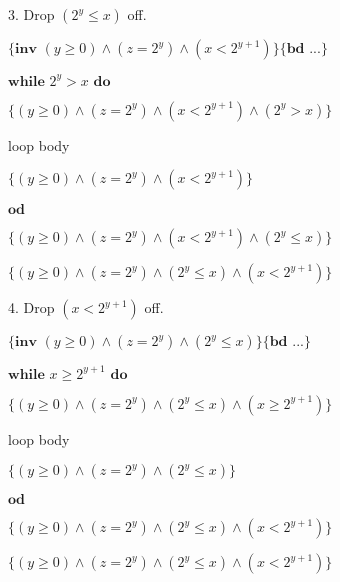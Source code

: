 \documentclass{article}
\begin{document}
\vspace{10pt}
3. Drop $(2^y \leq x)$ off.
\vspace{10pt}

$\{\textbf{inv } (y \geq 0) \wedge (z=2^y) \wedge (x<2^{y+1})\} \{\textbf{bd } ...\}$

$\textbf{while } 2^y > x \textbf{ do}$

\qquad \qquad $\{(y \geq 0) \wedge (z=2^y) \wedge (x<2^{y+1}) \wedge (2^y > x)\}$

\qquad \qquad loop body

\qquad \qquad $\{(y \geq 0) \wedge (z=2^y) \wedge (x<2^{y+1})\}$

$\textbf{od}$

$\{(y \geq 0) \wedge (z=2^y) \wedge (x<2^{y+1}) \wedge (2^y \leq x)\}$

$\{(y \geq 0) \wedge (z=2^y) \wedge (2^y \leq x) \wedge (x<2^{y+1})\}$

\vspace{10pt}
4. Drop $(x<2^{y+1})$ off.
\vspace{10pt}

$\{\textbf{inv } (y \geq 0) \wedge (z=2^y) \wedge (2^y \leq x)\} \{\textbf{bd } ...\}$

$\textbf{while } x \geq 2^{y+1} \textbf{ do}$

\qquad \qquad $\{(y \geq 0) \wedge (z=2^y) \wedge (2^y \leq x) \wedge (x \geq 2^{y+1})\}$

\qquad \qquad loop body

\qquad \qquad $\{(y \geq 0) \wedge (z=2^y) \wedge (2^y \leq x)\}$

$\textbf{od}$

$\{(y \geq 0) \wedge (z=2^y) \wedge (2^y \leq x) \wedge (x<2^{y+1})\}$

$\{(y \geq 0) \wedge (z=2^y) \wedge (2^y \leq x) \wedge (x<2^{y+1})\}$

\vspace{10pt}
\end{document}
